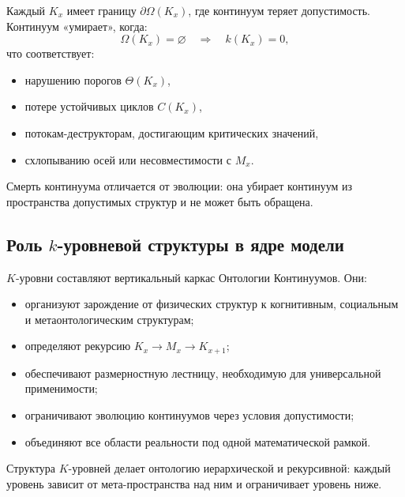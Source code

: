 Каждый $K_x$ имеет границу $\partial\Omega(K_x)$, где
континуум теряет допустимость.
Континуум «умирает», когда:
\[
\Omega(K_x) = \varnothing
\quad\Rightarrow\quad
k(K_x) = 0,
\]
что соответствует:
\begin{itemize}
    \item нарушению порогов $\Theta(K_x)$,
    \item потере устойчивых циклов $C(K_x)$,
    \item потокам-деструкторам, достигающим критических значений,
    \item схлопыванию осей или несовместимости с $M_x$.
\end{itemize}

Смерть континуума отличается от эволюции: она убирает континуум из
пространства допустимых структур и не может быть обращена.


\subsection{Роль \texorpdfstring{$k$}{k}-уровневой структуры в ядре модели}

$K$-уровни составляют вертикальный каркас Онтологии Континуумов.
Они:
\begin{itemize}
    \item организуют зарождение от физических структур к когнитивным,
          социальным и метаонтологическим структурам;
    \item определяют рекурсию $K_x \to M_x \to K_{x+1}$;
    \item обеспечивают размерностную лестницу, необходимую для универсальной
          применимости;
    \item ограничивают эволюцию континуумов через условия допустимости;
    \item объединяют все области реальности под одной математической рамкой.
\end{itemize}

Структура $K$-уровней делает онтологию иерархической и рекурсивной:
каждый уровень зависит от мета-пространства над ним и ограничивает уровень
ниже.

